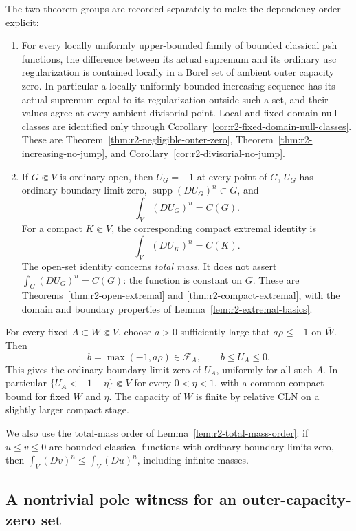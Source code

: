 \documentclass[11pt,a4paper]{article}
\numberwithin{equation}{section}
\theoremstyle{definition}
\theoremstyle{remark}
\begin{document}
The two theorem groups are recorded separately to make the dependency
order explicit:
\begin{enumerate}[label=\textup{(\Alph*)}]
\item[\textup{(N)}] For every locally uniformly upper-bounded family
of bounded classical psh functions, the difference between its actual
supremum and its ordinary usc regularization is contained locally in
a Borel set of ambient outer capacity zero. In particular a locally
uniformly bounded increasing sequence has its actual supremum equal
to its regularization outside such a set, and their values agree at
every ambient divisorial point. Local and fixed-domain null classes
are identified only through
Corollary~\ref{cor:r2-fixed-domain-null-classes}.
These are Theorem~\ref{thm:r2-negligible-outer-zero},
Theorem~\ref{thm:r2-increasing-no-jump}, and
Corollary~\ref{cor:r2-divisorial-no-jump}.

\item[\textup{(E)}] If $G\Subset V$ is ordinary open, then $U_G=-1$
at every point of $G$, $U_G$ has ordinary boundary limit zero,
$\operatorname{supp}(DU_G)^n\subset\overline G$, and
\[
 \int_V(DU_G)^n=C(G).
\]
For a compact $K\Subset V$, the corresponding compact extremal
identity is
\[
 \int_V(DU_K)^n=C(K).
\]
The open-set identity concerns \emph{total mass}. It does not assert
$\int_G(DU_G)^n=C(G)$: the function is constant on $G$.
These are Theorems~\ref{thm:r2-open-extremal} and
\ref{thm:r2-compact-extremal}, with the domain and boundary
properties of Lemma~\ref{lem:r2-extremal-basics}.
\end{enumerate}

For every fixed $A\subset W\Subset V$, choose $a>0$ sufficiently
large that $a\rho\leq-1$ on $\overline W$. Then
\[
 b=\max(-1,a\rho)\in\mathcal F_A,
 \qquad b\leq U_A\leq0.
\]
This gives the ordinary boundary limit zero of $U_A$, uniformly for
all such $A$. In particular $\{U_A<-1+\eta\}\Subset V$ for every
$0<\eta<1$, with a common compact bound for fixed $W$ and $\eta$.
The capacity of $W$ is finite by relative CLN on a slightly larger
compact stage.

We also use the total-mass order of
Lemma~\ref{lem:r2-total-mass-order}: if $u\leq v\leq0$ are bounded
classical functions with ordinary boundary limits zero, then
$\int_V(Dv)^n\leq\int_V(Du)^n$, including infinite masses.

\subsection{A nontrivial pole witness for an outer-capacity-zero set}
\end{document}
